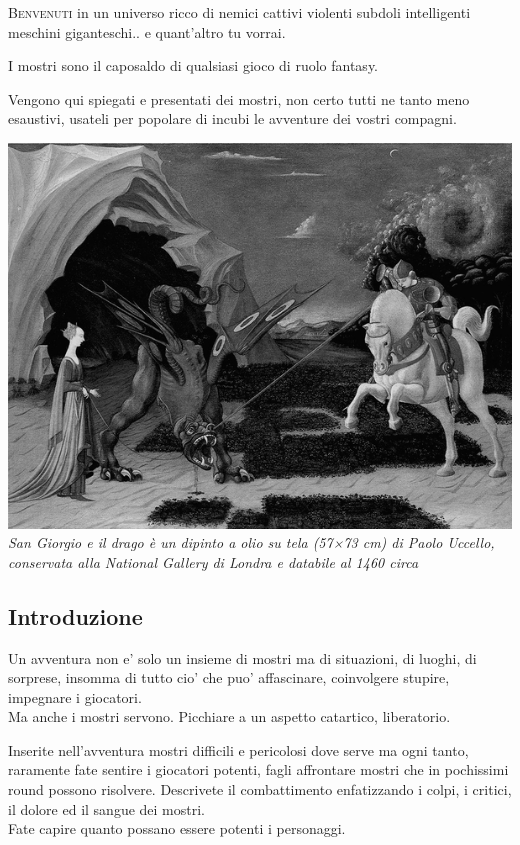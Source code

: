 \begin{multicols}{2}

\lettrine{B}{envenuti} in un universo ricco di nemici cattivi violenti subdoli intelligenti meschini giganteschi.. e quant'altro tu vorrai.

I mostri sono il caposaldo di qualsiasi gioco di ruolo fantasy.

Vengono qui spiegati e presentati dei mostri, non certo tutti ne tanto meno esaustivi, usateli per popolare di incubi le avventure dei vostri compagni.


\begin{center}
	\includegraphics[width=0.9\linewidth]{immagini/sangiorgioedrago.png}\\
	\textit{San Giorgio e il drago è un dipinto a olio su tela (57×73 cm) di Paolo Uccello, conservata alla National Gallery di Londra e databile al 1460 circa}
\end{center}


\subsection{Introduzione}

Un avventura non e' solo un insieme di mostri ma di situazioni, di luoghi, di sorprese, insomma di tutto cio' che puo' affascinare, coinvolgere stupire, impegnare i giocatori.\\
Ma anche i mostri servono. Picchiare a un aspetto catartico, liberatorio.

Inserite nell'avventura mostri difficili e pericolosi dove serve ma ogni tanto, raramente fate sentire i giocatori potenti, fagli affrontare mostri che in pochissimi round possono risolvere. Descrivete il combattimento enfatizzando i colpi, i critici, il dolore ed il sangue dei mostri.\\
Fate capire quanto possano essere potenti i personaggi.


\end{multicols}
